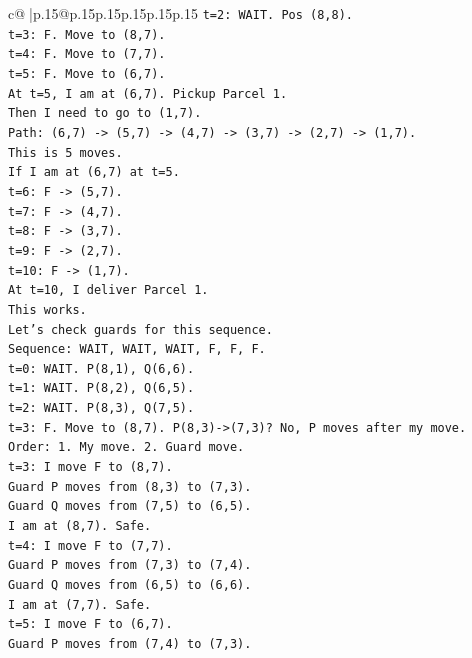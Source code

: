 \documentclass{article}
\begin{document}
{\begin{supertabular}{c@{$\;$}|p{.15\linewidth}@{}p{.15\linewidth}p{.15\linewidth}p{.15\linewidth}p{.15\linewidth}p{.15\linewidth}}
{{{\texttt{t=2: WAIT. Pos (8,8).} \\
\texttt{t=3: F. Move to (8,7).} \\
\texttt{t=4: F. Move to (7,7).} \\
\texttt{t=5: F. Move to (6,7).} \\
\texttt{At t=5, I am at (6,7). Pickup Parcel 1.} \\
\texttt{Then I need to go to (1,7).} \\
\texttt{Path: (6,7) {-}> (5,7) {-}> (4,7) {-}> (3,7) {-}> (2,7) {-}> (1,7).} \\
\texttt{This is 5 moves.} \\
\texttt{If I am at (6,7) at t=5.} \\
\texttt{t=6: F {-}> (5,7).} \\
\texttt{t=7: F {-}> (4,7).} \\
\texttt{t=8: F {-}> (3,7).} \\
\texttt{t=9: F {-}> (2,7).} \\
\texttt{t=10: F {-}> (1,7).} \\
\texttt{At t=10, I deliver Parcel 1.} \\
\texttt{This works.} \\
\texttt{Let's check guards for this sequence.} \\
\texttt{Sequence: WAIT, WAIT, WAIT, F, F, F.} \\
\texttt{t=0: WAIT. P(8,1), Q(6,6).} \\
\texttt{t=1: WAIT. P(8,2), Q(6,5).} \\
\texttt{t=2: WAIT. P(8,3), Q(7,5).} \\
\texttt{t=3: F. Move to (8,7). P(8,3){-}>(7,3)? No, P moves after my move.} \\
\texttt{Order: 1. My move. 2. Guard move.} \\
\texttt{t=3: I move F to (8,7).} \\
\texttt{Guard P moves from (8,3) to (7,3).} \\
\texttt{Guard Q moves from (7,5) to (6,5).} \\
\texttt{I am at (8,7). Safe.} \\
\texttt{t=4: I move F to (7,7).} \\
\texttt{Guard P moves from (7,3) to (7,4).} \\
\texttt{Guard Q moves from (6,5) to (6,6).} \\
\texttt{I am at (7,7). Safe.} \\
\texttt{t=5: I move F to (6,7).} \\
\texttt{Guard P moves from (7,4) to (7,3).} \\
}}}
\end{supertabular}}
\end{document}
